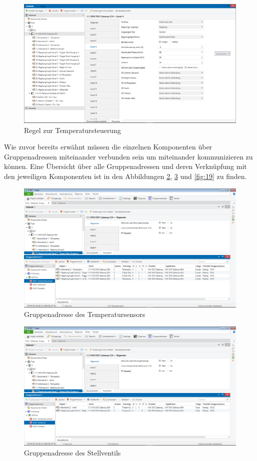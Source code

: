 \documentclass[a4paper]{article}
\begin{document}
\begin{figure}[h!]
	\centering
	\includegraphics[width=13cm]{Doku/16}
	\caption{Regel zur Temperatursteuerung}
	\label{fig:16}
\end{figure}

Wie zuvor bereits erwähnt müssen die einzelnen Komponenten über Gruppenadressen miteinander verbunden sein um miteinander kommunizieren zu können.
Eine Übersicht über alle Gruppenadressen und deren Verknüpfung mit den jeweiligen Komponenten ist in den Abbildungen \ref{fig:17}, \ref{fig:18} und \ref{fig:19} zu finden.

\begin{figure}[h!]
	\centering
	\includegraphics[width=13cm]{Doku/17}
	\caption{Gruppenadresse des Temperatursensors}
	\label{fig:17}
\end{figure}

\begin{figure}[h!]
	\centering
	\includegraphics[width=13cm]{Doku/18}
	\caption{Gruppenadresse des Stellventils}
	\label{fig:18}
\end{figure}
\end{document}
